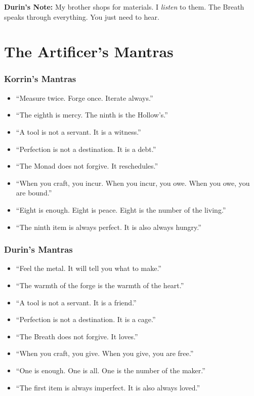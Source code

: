 \documentclass[11pt]{book}
\begin{document}
\vspace{0.5cm}
\textbf{Durin's Note:} My brother shops for materials. I \textit{listen} to them. The Breath speaks through everything. You just need to hear.

\newpage
\chapter{The Artificer's Mantras}

\subsection*{Korrin's Mantras}

\begin{itemize}
    \item ``Measure twice. Forge once. Iterate always.''
    \item ``The eighth is mercy. The ninth is the Hollow's.''
    \item ``A tool is not a servant. It is a witness.''
    \item ``Perfection is not a destination. It is a debt.''
    \item ``The Monad does not forgive. It reschedules.''
    \item ``When you craft, you incur. When you incur, you owe. When you owe, you are bound.''
    \item ``Eight is enough. Eight is peace. Eight is the number of the living.''
    \item ``The ninth item is always perfect. It is also always hungry.''
\end{itemize}

\subsection*{Durin's Mantras}

\begin{itemize}
    \item ``Feel the metal. It will tell you what to make.''
    \item ``The warmth of the forge is the warmth of the heart.''
    \item ``A tool is not a servant. It is a friend.''
    \item ``Perfection is not a destination. It is a cage.''
    \item ``The Breath does not forgive. It loves.''
    \item ``When you craft, you give. When you give, you are free.''
    \item ``One is enough. One is all. One is the number of the maker.''
    \item ``The first item is always imperfect. It is also always loved.''
\end{itemize}
\end{document}
